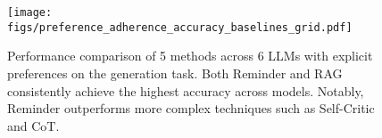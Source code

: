 \begin{figure}[ht]
    \centering
    \texttt{[image: figs/preference\_adherence\_accuracy\_baselines\_grid.pdf]}
       
\caption{Performance comparison of 5 methods across 6 LLMs with explicit preferences on the generation task. Both Reminder and RAG consistently achieve the highest accuracy across models. Notably, Reminder outperforms more complex techniques such as Self-Critic and CoT.}
    \label{fig:baselines}
\end{figure}





    
    





